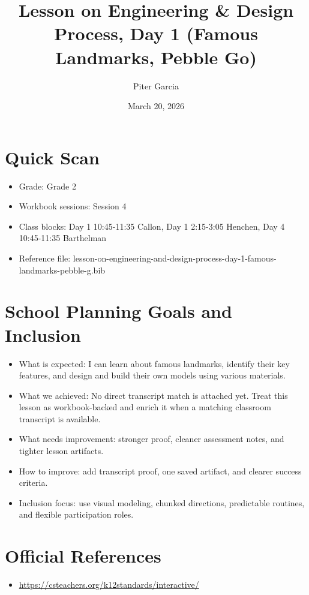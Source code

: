 \documentclass[11pt]{article}
\title{Lesson on Engineering & Design Process, Day 1 (Famous Landmarks, Pebble Go)}
\author{Piter Garcia}
\date{March 20, 2026}
\begin{document}
\maketitle
\section*{Quick Scan}
\begin{itemize}[leftmargin=*]
\item Grade: Grade 2
\item Workbook sessions: Session 4
\item Class blocks: Day 1 10:45-11:35 Callon, Day 1 2:15-3:05 Henchen, Day 4 10:45-11:35 Barthelman
\item Reference file: lesson-on-engineering-and-design-process-day-1-famous-landmarks-pebble-g.bib
\end{itemize}
\section*{School Planning Goals and Inclusion}
\begin{itemize}[leftmargin=*]
\item What is expected: I can learn about famous landmarks, identify their key features, and design and build their own models using various materials.
\item What we achieved: No direct transcript match is attached yet. Treat this lesson as workbook-backed and enrich it when a matching classroom transcript is available.
\item What needs improvement: stronger proof, cleaner assessment notes, and tighter lesson artifacts.
\item How to improve: add transcript proof, one saved artifact, and clearer success criteria.
\item Inclusion focus: use visual modeling, chunked directions, predictable routines, and flexible participation roles.
\end{itemize}
\section*{Official References}
\begin{itemize}[leftmargin=*]
\item \url{https://csteachers.org/k12standards/interactive/}

\end{itemize}
\end{document}
